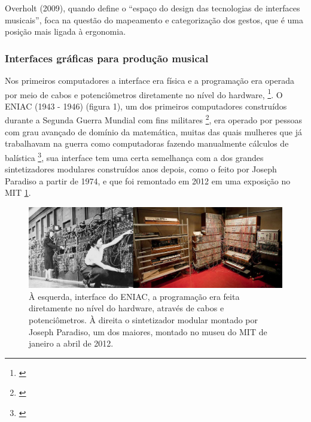 Overholt (2009), quando define o ``espaço do design das tecnologias de interfaces musicais'', foca na questão do mapeamento e categorização dos gestos, que é uma posição mais ligada à ergonomia.



\subsubsection{Interfaces gráficas para produção musical}

Nos primeiros computadores a interface era física e a programação era operada por meio de cabos e potenciômetros diretamente no nível do hardware, \footnote{\cite[110]{Henrique1996}}. O ENIAC (1943 - 1946) (figura 1), um dos primeiros computadores construídos durante a Segunda Guerra Mundial com fins militares \footnote{\cite[24]{Stolfi}}, era operado por pessoas com grau avançado de domínio da matemática, muitas das quais mulheres que já trabalhavam na guerra como computadoras fazendo manualmente cálculos de balística \footnote{\cite{HayleyWilliams2015}}, sua interface tem uma certa semelhança com a dos grandes sintetizadores modulares construídos anos depois, como o feito por Joseph Paradiso a partir de 1974, e que foi remontado em 2012 em uma exposição no MIT \ref{analogicos}. 

\begin{figure}
    \caption{\label{analogicos}À esquerda, interface do ENIAC, a programação era feita diretamente no nível do hardware, através de cabos e potenciômetros.  À direita o sintetizador modular montado por Joseph Paradiso, um dos maiores, montado no museu do MIT de janeiro a abril de 2012.}
    
        \includegraphics[width=1\linewidth]{pictures/analogicos}
    
\end{figure}

